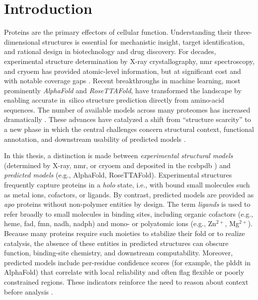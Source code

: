 
\chapter{Introduction}
\label{chap:introduction}

Proteins are the primary effectors of cellular function. Understanding their three-dimensional structures is essential for mechanistic insight, target identification, and rational design in biotechnology and drug discovery. For decades, experimental structure determination by X-ray crystallography, \gls{nmr} spectroscopy, and \gls{cryoem} has provided atomic-level information, but at significant cost and with notable coverage gaps \cite{monteirodasilvaHighthroughputPredictionProtein2024}. Recent breakthroughs in machine learning, most prominently \textit{AlphaFold} and \textit{RoseTTAFold}, have transformed the landscape by enabling accurate in~silico structure prediction directly from amino-acid sequences. The number of available models across many proteomes has increased dramatically \cite{jumperHighlyAccurateProtein2021, baekAccuratePredictionProtein2021,tunyasuvunakoolHighlyAccurateProtein2021}. These advances have catalyzed a shift from ``structure scarcity'' to a new phase in which the central challenges concern structural context, functional annotation, and downstream usability of predicted models \cite{porta-pardoStructuralCoverageHuman2022}.

In this thesis, a distinction is made between \emph{experimental structural models} (determined by X-ray, \gls{nmr}, or \gls{cryoem} and deposited in the \gls{rcsbpdb} \cite{burleyRCSBProteinData2019}) and \emph{predicted models} (e.g., AlphaFold, RoseTTAFold). Experimental structures frequently capture proteins in a \emph{holo} state, i.e., with bound small molecules such as metal ions, cofactors, or ligands. By contrast, predicted models are provided as \emph{apo} proteins without non-polymer entities by design. The term \emph{ligands} is used to refer broadly to small molecules in binding sites, including organic cofactors (e.g., heme, \gls{fad}, \gls{fmn}, \gls{nadh}, \gls{nadph}) and mono- or polyatomic ions (e.g., Zn$^{2+}$, Mg$^{2+}$). Because many proteins require such moieties to stabilize their fold or to realize catalysis, the absence of these entities in predicted structures can obscure function, binding-site chemistry, and downstream computability. Moreover, predicted models include per-residue confidence scores (for example, the \gls{plddt} in AlphaFold) that correlate with local reliability and often flag flexible or poorly constrained regions. These indicators reinforce the need to reason about context before analysis \cite{jumperHighlyAccurateProtein2021, burleyRCSBProteinData2019, hekkelmanAlphaFillEnrichingAlphaFold2023}.

